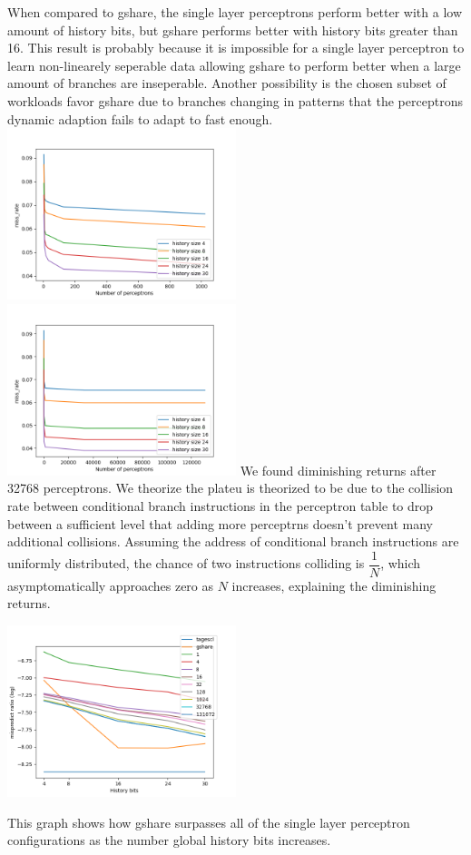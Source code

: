 \documentclass{article}
\begin{document}
When compared to gshare, the single layer perceptrons perform better with a low amount of history bits, but gshare performs better with history bits greater than 16. This result is probably because it is impossible for a single layer perceptron to learn non-linearely seperable data allowing gshare to perform better when a large amount of branches are inseperable. Another possibility is the chosen subset of workloads favor gshare due to branches changing in patterns that the perceptrons dynamic adaption fails to adapt to fast enough.\\
\includegraphics[width=0.5\textwidth]{./cse220data/data_1_layer/x_num_perceptrons_no_last_2.png}
\includegraphics[width=0.5\textwidth]{./cse220data/data_1_layer/x_num_perceptrons_all.png}
We found diminishing returns after 32768 perceptrons. We theorize the plateu is theorized to be due to the collision rate between conditional branch instructions in the perceptron table to drop between a sufficient level that adding more perceptrns doesn't prevent many additional collisions. Assuming the address of conditional branch instructions are uniformly distributed, the chance of two instructions colliding is $\dfrac{1}{N}$, which asymptomatically approaches zero as $N$ increases, explaining the diminishing returns.\\
\begin{center}
  \includegraphics[width=0.5\textwidth]{./cse220data/data_1_layer/x_hist.png}
\end{center}
This graph shows how gshare surpasses all of the single layer perceptron configurations as the number global history bits increases.
\end{document}
